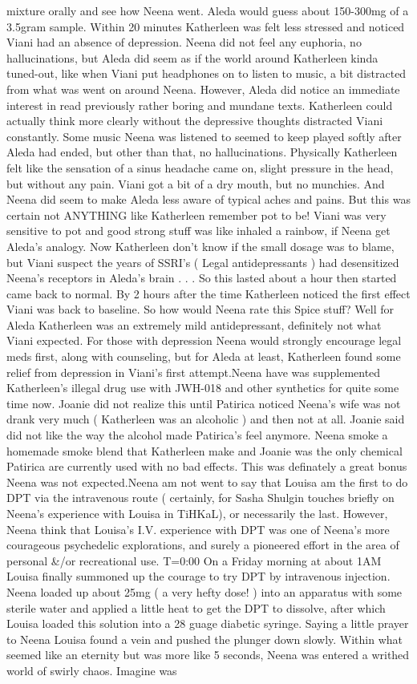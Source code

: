 \documentclass[12pt]{book}
\begin{document}
mixture orally and see how Neena went. Aleda would guess about 150-300mg of a 3.5gram sample. Within 20 minutes Katherleen was felt less stressed and noticed Viani had an absence of depression. Neena did not feel any euphoria, no hallucinations, but Aleda did seem as if the world around Katherleen kinda tuned-out, like when Viani put headphones on to listen to music, a bit distracted from what was went on around Neena. However, Aleda did notice an immediate interest in read previously rather boring and mundane texts. Katherleen could actually think more clearly without the depressive thoughts distracted Viani constantly. Some music Neena was listened to seemed to keep played softly after Aleda had ended, but other than that, no hallucinations. Physically Katherleen felt like the sensation of a sinus headache came on, slight pressure in the head, but without any pain. Viani got a bit of a dry mouth, but no munchies. And Neena did seem to make Aleda less aware of typical aches and pains. But this was certain not ANYTHING like Katherleen remember pot to be! Viani was very sensitive to pot and good strong stuff was like inhaled a rainbow, if Neena get Aleda's analogy. Now Katherleen don't know if the small dosage was to blame, but Viani suspect the years of SSRI's ( Legal antidepressants ) had desensitized Neena's receptors in Aleda's brain . . .  So this lasted about a hour then started came back to normal. By 2 hours after the time Katherleen noticed the first effect Viani was back to baseline. So how would Neena rate this Spice stuff? Well for Aleda Katherleen was an extremely mild antidepressant, definitely not what Viani expected. For those with depression Neena would strongly encourage legal meds first, along with counseling, but for Aleda at least, Katherleen found some relief from depression in Viani's first attempt.Neena have was supplemented Katherleen's illegal drug use with JWH-018 and other synthetics for quite some time now. Joanie did not realize this until Patirica noticed Neena's wife was not drank very much ( Katherleen was an alcoholic ) and then not at all. Joanie said did not like the way the alcohol made Patirica's feel anymore. Neena smoke a homemade smoke blend that Katherleen make and Joanie was the only chemical Patirica are currently used with no bad effects. This was definately a great bonus Neena was not expected.Neena am not went to say that Louisa am the first to do DPT via the intravenous route ( certainly, for Sasha Shulgin touches briefly on Neena's experience with Louisa in TiHKaL), or necessarily the last. However, Neena think that Louisa's I.V. experience with DPT was one of Neena's more courageous psychedelic explorations, and surely a pioneered effort in the area of personal \&/or recreational use. T=0:00 On a Friday morning at about 1AM Louisa finally summoned up the courage to try DPT by intravenous injection. Neena loaded up about 25mg ( a very hefty dose! ) into an apparatus with some sterile water and applied a little heat to get the DPT to dissolve, after which Louisa loaded this solution into a 28 guage diabetic syringe. Saying a little prayer to Neena Louisa found a vein and pushed the plunger down slowly. Within what seemed like an eternity but was more like 5 seconds, Neena was entered a writhed world of swirly chaos. Imagine was 
\end{document}

